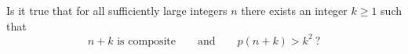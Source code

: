 Is it true that for all sufficiently large integers $n$ there exists an integer $k\ge1$ such that
\[
\text{$n+k$ is composite}\qquad\text{and}\qquad p(n+k)>k^{2}\ ?
\]
